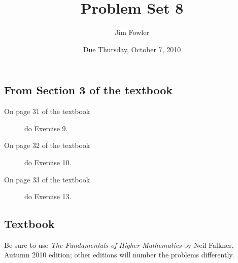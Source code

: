 \documentclass[12pt]{handout}
\author{Jim Fowler}
\title{Problem Set 8}
\date{Due Thursday, October  7, 2010}
\begin{document}
\maketitle










\subsection*{From Section 3 of the textbook}



\begin{description}

\item[On page 31 of the textbook] do Exercise 9.

\item[On page 32 of the textbook] do Exercise 10.

\item[On page 33 of the textbook] do Exercise 13.

\end{description}











\subsection*{Textbook}
Be sure to use \textit{The Fundamentals of Higher Mathematics} by Neil Falkner, Autumn 2010 edition; other editions will number the problems differently.
\end{document}
